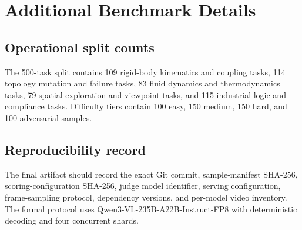 \section{Additional Benchmark Details}

\subsection{Operational split counts}

The 500-task split contains 109 rigid-body kinematics and coupling tasks, 114 topology mutation and failure tasks, 83 fluid dynamics and thermodynamics tasks, 79 spatial exploration and viewpoint tasks, and 115 industrial logic and compliance tasks. Difficulty tiers contain 100 easy, 150 medium, 150 hard, and 100 adversarial samples.

\subsection{Reproducibility record}

The final artifact should record the exact Git commit, sample-manifest SHA-256, scoring-configuration SHA-256, judge model identifier, serving configuration, frame-sampling protocol, dependency versions, and per-model video inventory. The formal protocol uses Qwen3-VL-235B-A22B-Instruct-FP8 with deterministic decoding and four concurrent shards.
